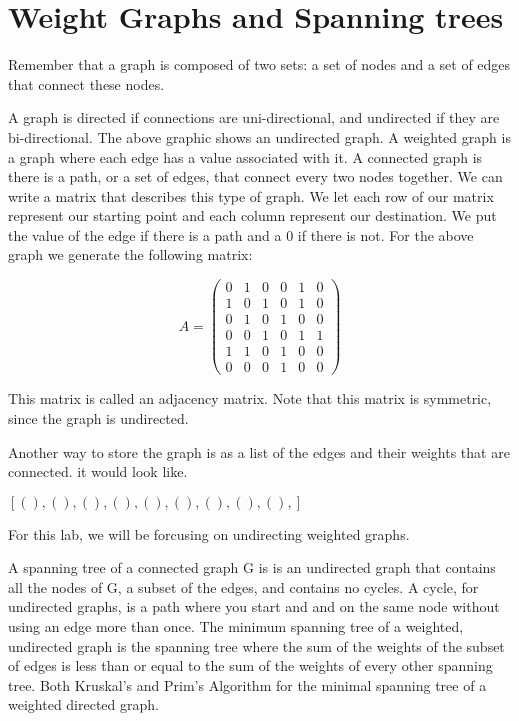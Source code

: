 \label{Ch:Kruskal}


\section*{Weight Graphs and Spanning trees}


Remember that a graph is composed of two sets: a set of nodes and a set of edges that connect these nodes. 

A graph is directed if connections are uni-directional, and undirected if they are bi-directional. The above graphic shows an undirected graph. A weighted graph is a graph where each edge has a value associated with it. A connected graph is there is a path, or a set of edges, that connect every two nodes together. We can write a matrix that describes this type of graph. We let each row of our matrix represent our starting point and each column represent our destination. We put the value of the edge if there is a path and a 0 if there is not. For the above graph we generate the following matrix:

\[
A = \begin{pmatrix}
0 & 1 & 0 & 0 & 1 & 0\\
1 & 0 & 1 & 0 & 1 & 0\\
0 & 1 & 0 & 1 & 0 & 0\\
0 & 0 & 1 & 0 & 1 & 1\\
1 & 1 & 0 & 1 & 0 & 0\\
0 & 0 & 0 & 1 & 0 & 0
\end{pmatrix}
\]

This matrix is called an adjacency matrix. Note that this matrix is symmetric, since the graph is undirected. 

Another way to store the graph is as a list of the edges and their weights that are connected. it would look like.

$[(   ),
 (   ),
 (   ),
 (   ),
 (   ),
 (   ),
 (   ),
 (   ),
 (   ),]$

For this lab, we will be forcusing on undirecting weighted graphs. 

A spanning tree of a connected graph G is is an undirected graph that contains all the nodes of G, a subset of the edges, and contains no cycles. A cycle, for undirected graphs, is a path where you start and and on the same node without using an edge more than once. The minimum spanning tree of a weighted, undirected graph is the spanning tree where the sum of the weights of the subset of edges is less than or equal to the sum of the weights of every other spanning tree. Both Kruskal's and Prim's Algorithm for the minimal spanning tree of a weighted directed graph.

